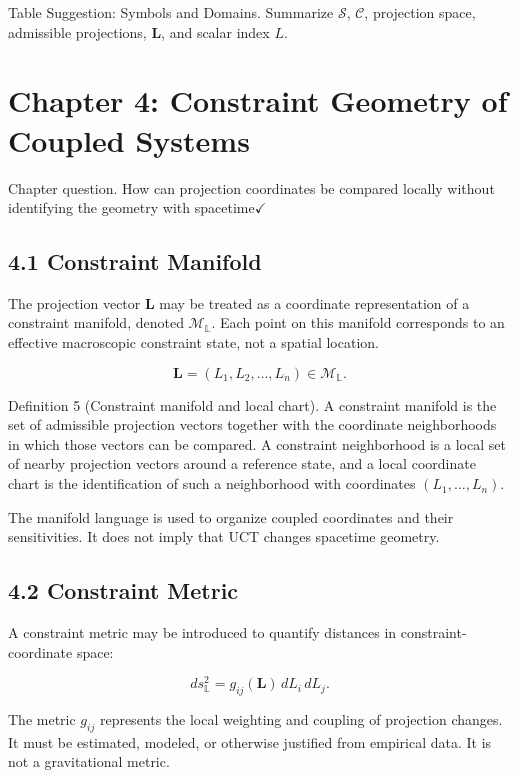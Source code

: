 \documentclass[aps,pre,reprint,superscriptaddress,nofootinbib]{revtex4-2}
\begin{document}
Table Suggestion: Symbols and Domains. Summarize \(\mathcal{S}\), \(\mathcal{C}\), projection space, admissible projections, \(\mathbf{L}\), and scalar index \(L\).

\section{Chapter 4: Constraint Geometry of Coupled Systems}

Chapter question. How can projection coordinates be compared locally without identifying the geometry with spacetime$\checkmark$

\subsection{4.1 Constraint Manifold}

The projection vector \(\mathbf{L}\) may be treated as a coordinate representation of a constraint manifold, denoted \(\mathcal{M}_{\mathbb{L}}\). Each point on this manifold corresponds to an effective macroscopic constraint state, not a spatial location.

\[ \mathbf{L}=(L_1,L_2,\ldots,L_n)\in\mathcal{M}_{\mathbb{L}}. \]

Definition 5 (Constraint manifold and local chart). A constraint manifold is the set of admissible projection vectors together with the coordinate neighborhoods in which those vectors can be compared. A constraint neighborhood is a local set of nearby projection vectors around a reference state, and a local coordinate chart is the identification of such a neighborhood with coordinates \((L_1,\ldots,L_n)\).

The manifold language is used to organize coupled coordinates and their sensitivities. It does not imply that UCT changes spacetime geometry.

\subsection{4.2 Constraint Metric}

A constraint metric may be introduced to quantify distances in constraint-coordinate space:

\[ ds_{\mathbb{L}}^2=g_{ij}(\mathbf{L})\,dL_i\,dL_j. \]

The metric \(g_{ij}\) represents the local weighting and coupling of projection changes. It must be estimated, modeled, or otherwise justified from empirical data. It is not a gravitational metric.
\end{document}
